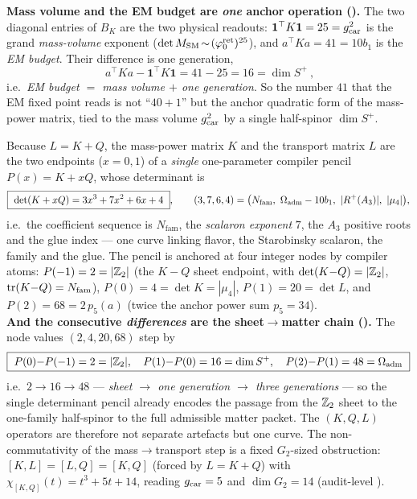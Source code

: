 \begin{winbox}
\noindent\textbf{Mass volume and the EM budget are \emph{one} anchor operation
().} The two diagonal entries of $B_K$ are the two physical readouts:
$\mathbf1^\top K\mathbf1=25=g_{\mathrm{car}}^2$ is the grand \emph{mass-volume} exponent ($\det M_{\rm SM}\!\sim\!(\varphi_0^{\mathrm{ret}})^{25}$),
and $a^\top K a=41=10b_1$ is the \emph{EM budget}. Their difference is one generation,
\[
  \boxed{\ a^\top K a-\mathbf1^\top K\mathbf1=41-25=16=\dim S^+\ },
\]
i.e.\ \emph{EM budget $=$ mass volume $+$ one generation}. So the number $41$ that the EM fixed point reads is
not ``$40{+}1$'' but the anchor quadratic form of the mass-power matrix, tied to the mass volume $g_{\mathrm{car}}^2$ by
a single half-spinor $\dim S^+$.
\end{winbox}

\begin{winbox}
Because $L=K+Q$, the mass-power matrix $K$ and the transport matrix $L$ are the two endpoints
($x=0,1$) of a \emph{single} one-parameter compiler pencil $P(x)=K+xQ$, whose determinant is
\[
  \boxed{\ \det(K+xQ)=3x^3+7x^2+6x+4\ },\qquad
  (3,7,6,4)=\bigl(\Nfam,\ \Oadm-10b_1,\ |R^+(A_3)|,\ |\mu_4|\bigr),
\]
i.e.\ the coefficient sequence is $N_{\mathrm{fam}}$, the \emph{scalaron exponent} $7$, the $A_3$ positive
roots and the glue index --- one curve linking flavor, the Starobinsky scalaron, the family and the glue.
The pencil is anchored at four integer nodes by compiler atoms:
$P(-1)=2=|\mathbb{Z}_2|$ (the $K{-}Q$ sheet endpoint, with $\det(K{-}Q)=|\mathbb{Z}_2|$, $\operatorname{tr}(K{-}Q)=N_{\mathrm{fam}}$),
$P(0)=4=\det K=|\mu_4|$, $P(1)=20=\det L$, and $P(2)=68=2\,p_5(a)$ (twice the anchor power sum $p_5=34$).
\smallskip\\
\noindent\textbf{And the consecutive \emph{differences} are the sheet$\to$matter chain
().} The node values $(2,4,20,68)$ step by
\[
  \boxed{\ P(0){-}P(-1)=2=|\Z_2|,\quad P(1){-}P(0)=16=\dim S^+,\quad P(2){-}P(1)=48=\Oadm\ }
\]
i.e.\ $2\to16\to48$ --- \emph{sheet $\to$ one generation $\to$ three generations} --- so the single
determinant pencil already encodes the passage from the $\mathbb{Z}_2$ sheet to the one-family half-spinor to the
full admissible matter packet. The $(K,Q,L)$ operators are therefore not separate artefacts but one curve.
The non-commutativity of the mass$\to$transport step is a fixed $G_2$-sized obstruction:
$[K,L]=[L,Q]=[K,Q]$ (forced by $L=K+Q$) with $\chi_{[K,Q]}(t)=t^3+5t+14$, reading $g_{\mathrm{car}}=5$ and
$\dim G_2=14$ (audit-level \mO). 
\end{winbox}

